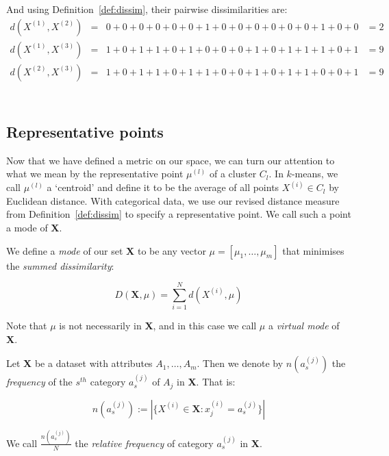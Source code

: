 \begin{example}
    And using Definition~\ref{def:dissim}, their pairwise dissimilarities are:
    \begin{equation}
    \nonumber
    \begin{aligned}
        d(X^{(1)}, X^{(2)}) & = & 0 + 0 + 0 + 0 + 0 + 0 + 1 + 0 + 0 + 0 + 0 + 0 
        + 0 + 1 + 0 + 0 & = 2
        \\
        d(X^{(1)}, X^{(3)}) & = & 1 + 0 + 1 + 1 + 0 + 1 + 0 + 0 + 0 + 1 + 0 + 1 
        + 1 + 1 + 0 + 1 & = 9
        \\
        d(X^{(2)}, X^{(3)}) & = & 1 + 0 + 1 + 1 + 0 + 1 + 1 + 0 + 0 + 1 + 0 + 1
        + 1 + 0 + 0 + 1 & = 9
        \\
    \end{aligned}
    \end{equation}
    \\
\end{example}

\subsection{Representative points}\label{subsec:rep-points}

Now that we have defined a metric on our space, we can turn our attention to 
what we mean by the representative point \(\mu^{(l)}\) of a cluster \(C_l\). In 
\(k\)-means, we call \(\mu^{(l)}\) a `centroid' and define it to be the average 
of all points \(X^{(i)} \in C_l\) by Euclidean distance. With categorical data, 
we use our revised distance measure from Definition~\ref{def:dissim} to specify 
a representative point. We call such a point a mode of \textbf{X}.\\

\begin{definition}\label{def:mode}
    We define a \emph{mode} of our set \textbf{X} to be any vector \(\mu = 
    [\mu_1, \ldots, \mu_m]\) that minimises the \emph{summed dissimilarity}:
	
    \begin{equation}
        D(\textbf{X}, \mu) = \sum_{i=1}^{N} d(X^{(i)}, \mu)
	\end{equation}
	
    Note that \(\mu\) is not necessarily in \textbf{X}, and in this case we call
    \(\mu\) a \emph{virtual mode} of \textbf{X}.
\end{definition}

\begin{definition}\label{def:rel-freq}
    Let \textbf{X} be a dataset with attributes \(A_1, \ldots, A_m\). Then we
    denote by \(n(a_s^{(j)})\) the \emph{frequency} of the \(s^{th}\) category 
    \(a_s^{(j)}\) of \(A_j\) in \textbf{X}. That is: 
	
    \[
	    n(a_s^{(j)}) := |{\{X^{(i)} \in \textbf{X}: x_j^{(i)} = a_s^{(j)}\}}|
	\]
	
    We call \(\frac{n(a_s^{(j)})}{N}\) the \emph{relative frequency} of category 
    \(a_s^{(j)}\) in \textbf{X}.
\end{definition}

